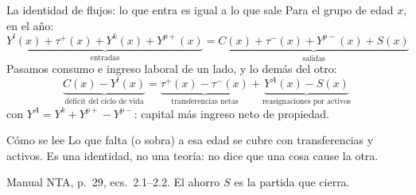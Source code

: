 \documentclass[aspectratio=169,11pt]{beamer}
\newcommand{\fuente}[1]{\par\vfill{\small\color{cGris}#1\par}}
\begin{document}
\begin{frame}{La identidad de flujos: lo que entra es igual a lo que sale}
  Para el grupo de edad $x$, en el año:
  \[
    \underbrace{Y^l(x)+\tau^+(x)+Y^k(x)+Y^{p+}(x)}_{\text{entradas}}
    =
    \underbrace{C(x)+\tau^-(x)+Y^{p-}(x)+S(x)}_{\text{salidas}}
  \]
  \pause
  Pasamos consumo e ingreso laboral de un lado, y lo demás del otro:
  \[
    \underbrace{C(x)-Y^l(x)}_{\text{déficit del ciclo de vida}}
    =
    \underbrace{\tau^+(x)-\tau^-(x)}_{\text{transferencias netas}}
    +
    \underbrace{Y^A(x)-S(x)}_{\text{reasignaciones por activos}}
  \]
  \pause
  con $Y^A=Y^k+Y^{p+}-Y^{p-}$: capital más ingreso neto de propiedad.
  \pause
  \begin{block}{Cómo se lee}
    Lo que falta (o sobra) a esa edad se cubre con transferencias y activos. Es una identidad, no una teoría: no dice que una cosa cause la otra.
  \end{block}
  \fuente{Manual NTA, p.~29, ecs.~2.1--2.2. El ahorro $S$ es la partida que cierra.}
\end{frame}
\end{document}
